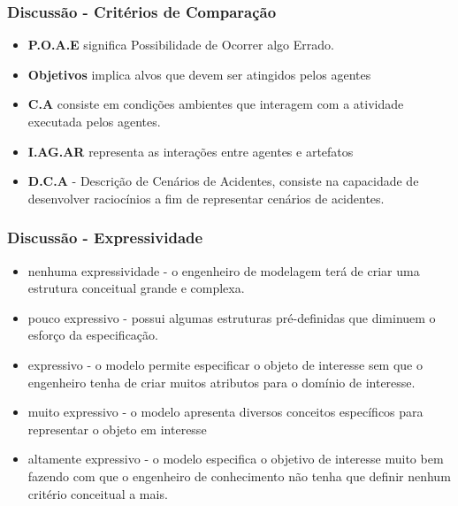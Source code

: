 \documentclass{beamer}
\begin{document}
\begin{frame}
	\frametitle{Discussão - Critérios de Comparação}
	\begin{itemize}
		\item \textbf{P.O.A.E} significa Possibilidade de Ocorrer algo Errado.
		\item \textbf{Objetivos} implica alvos que devem ser atingidos pelos agentes 
		\item \textbf{C.A} consiste em condições ambientes que interagem com a atividade executada pelos agentes.
		\item \textbf{I.AG.AR} representa as interações entre agentes e artefatos
		\item \textbf{D.C.A} - Descrição de Cenários de Acidentes, consiste na capacidade de desenvolver raciocínios a fim de representar cenários de acidentes.
	\end{itemize}
\end{frame}
\begin{frame}
	\frametitle{Discussão - Expressividade}
	\begin{itemize}
			\item nenhuma expressividade - o engenheiro de modelagem terá de criar uma estrutura conceitual grande e complexa. 
			\item pouco expressivo - possui algumas estruturas pré-definidas que diminuem o esforço da especificação. 
			\item expressivo - o modelo permite especificar o objeto de interesse sem que o engenheiro tenha de criar muitos atributos para o domínio de interesse.
			\item muito expressivo - o modelo apresenta diversos conceitos específicos para representar o objeto em interesse
			\item altamente expressivo - o modelo especifica o objetivo de interesse muito bem fazendo com que o engenheiro de conhecimento não tenha que definir nenhum critério conceitual a mais.
	\end{itemize}
\end{frame}
\end{document}
